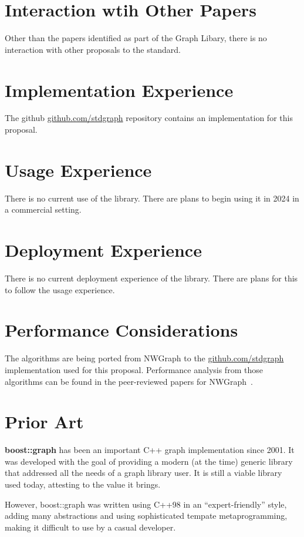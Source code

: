 \section{Interaction wtih Other Papers}
Other than the papers identified as part of the Graph Libary, there is no interaction with other proposals to the standard.

\section{Implementation Experience}
The github \href{https://github.com/stdgraph}{github.com/stdgraph} repository contains an implementation for this proposal.

\section{Usage Experience}
There is no current use of the library. There are plans to begin using it in 2024 in a commercial setting.

\section{Deployment Experience}
There is no current deployment experience of the library. There are plans for this to follow the usage experience.

\section{Performance Considerations}
The algorithms are being ported from NWGraph to the \href{https://github.com/stdgraph}{github.com/stdgraph} implementation used for this proposal. 
Performance analysis from those algorithms can be found in the peer-reviewed papers for NWGraph~\cite{REF_nwgraph_paper,gapbs_2023}.

\section{Prior Art}
\textbf{boost::graph} has been an important C++ graph implementation since 2001. It was developed with the goal of providing
a modern (at the time) generic library that addressed all the needs of a graph library user. It is still a viable library used today, attesting to the value it brings.

However, boost::graph was written using C++98 in an ``expert-friendly'' style, adding many abstractions and using sophisticated tempate metaprogramming, making it difficult to use by a casual developer.

